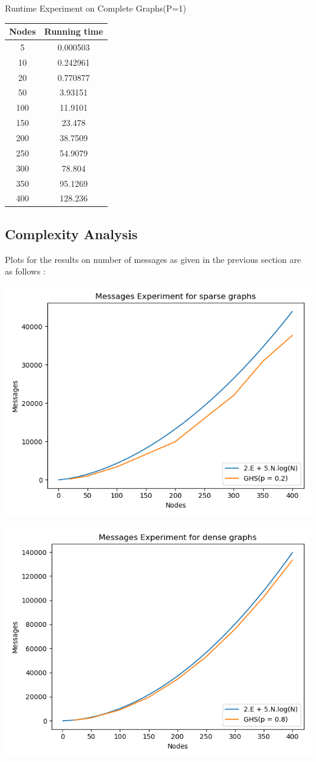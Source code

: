 \documentclass[letterpaper,11pt]{article}
\begin{document}
	\begin{center}
		Runtime Experiment on Complete Graphs(P=1) \\ 
		\begin{tabular}{|c|c|}
			\hline 
			{\bf Nodes}  & {\bf Running time} \\
			\hline 
      		5   & 0.000503 \\
			\hline 
     		10  & 0.242961 \\
			\hline 
      		20  & 0.770877 \\ 
			\hline 
			50  & 3.93151  \\
			\hline 
			100 & 11.9101  \\
			\hline 
			150 & 23.478  \\
			\hline 
			200 & 38.7509 \\
			\hline 
			250 & 54.9079 \\
			\hline 
			300 & 78.804  \\
			\hline 
			350 & 95.1269  \\
			\hline 
			400 & 128.236  \\
			\hline 
		\end{tabular}
	\end{center} 
	
	\subsection{Complexity Analysis}
	
	Plots for the results on number of messages as given in the previous section are as follows : 
	
	\includegraphics[width = 0.7 \textwidth]{sparse}
	
	\includegraphics[width = 0.7 \textwidth]{dense}
	
\end{document}

